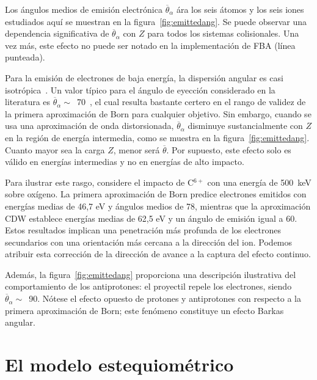 Los ángulos medios de emisión electrónica $\overline{\theta}_{\alpha}$ 
ára los seis átomos y los seis iones estudiados aquí se muestran en la 
figura~\ref{fig:emittedang}. Se puede observar una dependencia 
significativa de $\overline{\theta}_{\alpha}$ con $Z$ para todos los 
sistemas colisionales. Una vez más, este efecto no puede ser notado en 
la implementación de FBA (línea punteada).

Para la emisión de electrones de baja energía, la dispersión angular 
es casi isotrópica~\cite{Rudd1992}. Un valor típico para el ángulo de 
eyección considerado en la literatura es 
$\overline{\theta}_{\alpha}\sim$~70\textdegree~\cite{surdutovic2018}, el 
cual resulta bastante certero en el rango de validez de la primera 
aproximación de Born para cualquier objetivo. Sin embargo, cuando se 
usa una aproximación de onda distorsionada, $\overline{\theta}_{\alpha}$
disminuye sustancialmente con $Z$ en la región de energía intermedia, 
como se muestra en la figura~\ref{fig:emittedang}. Cuanto mayor sea la 
carga $Z$, menor será $\overline{\theta}$. Por supuesto, este efecto 
solo es válido en energías intermedias y no en energías de alto impacto.

Para ilustrar este rasgo, considere el impacto de C$^{6+}$ con una 
energía de 500~keV sobre oxígeno. La primera aproximación de Born 
predice electrones emitidos con energías medias de 46,7 eV y ángulos 
medios de 78\textdegree, mientras que la aproximación CDW establece 
energías medias de 62,5 eV y un ángulo de emisión igual a 60\textdegree. 
Estos resultados implican una penetración más profunda de los electrones 
secundarios con una orientación más cercana a la dirección del ion. 
Podemos atribuir esta corrección de la dirección de avance a la captura 
del efecto continuo.

Además, la figura~\ref{fig:emittedang} proporciona una descripción 
ilustrativa del comportamiento de los antiprotones: el proyectil repele 
los electrones, siendo $\overline{\theta}_{\alpha}\sim$~90\textdegree. 
Nótese el efecto opuesto de protones y antiprotones con respecto a la 
primera aproximación de Born; este fenómeno constituye un efecto Barkas 
angular.

\section{El modelo estequiométrico}
\label{sec:SSM}

